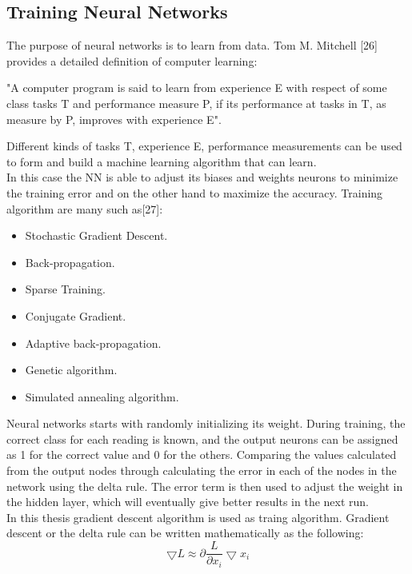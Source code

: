 \subsection{Training Neural Networks}
\hspace{5mm} The purpose of neural networks is to learn from data. Tom M. Mitchell [26] provides a detailed definition of computer learning:
\begin{displayquote}
"A computer program is said to learn from experience E with respect of some class tasks T and performance measure P, if its performance at tasks in T, as measure by P, improves with experience E".
\end{displayquote}
\hspace{5mm} Different kinds of tasks T, experience E, performance measurements can be used to form and build a machine learning algorithm that can learn.\\
In this case the NN is able to adjust its biases and weights neurons to minimize the training error and on the other hand to maximize the accuracy. Training algorithm are many such as[27]:
\begin{itemize}
    \item Stochastic Gradient Descent.
    \item Back-propagation.
    \item Sparse Training.
    \item Conjugate Gradient.
    \item Adaptive back-propagation.
    \item Genetic algorithm.
    \item Simulated annealing algorithm.
\end{itemize}
\hspace{5mm} Neural networks starts with randomly initializing its weight. During training, the correct class for each reading is known, and the output neurons can be assigned as 1 for the correct value and 0 for the others. Comparing the values calculated from the output nodes through calculating the error in each of the nodes in the network using  the delta rule. The error term is then used to adjust the weight in the hidden layer, which will eventually give better results in the next run.\\

In this thesis gradient descent algorithm is used as traing algorithm. Gradient descent or the delta rule can be written mathematically as the following:
\[\bigtriangledown L \approx \partial \frac{L}{\partial x_{i}}\bigtriangledown x_{i}\]\\

